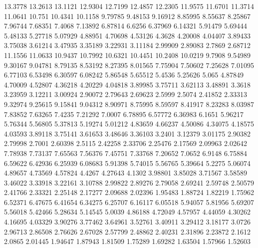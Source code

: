 13.3778      13.2613      13.1121      12.9304      12.7199      12.4857      12.2305      11.9575      11.6701      11.3714      11.0641      10.751      10.4341      10.1158      9.79785      9.48153      9.16912      8.85995      8.55637      8.25867      7.96744      7.68351      7.4068      7.13892      6.87814      6.6256      6.37969      6.14321      5.91479      5.69444      5.48133      5.27718      5.07929      4.88951      4.70698      4.53126      4.3628      4.20008      4.04407      3.89433      3.75038      3.61214      3.47935      3.35189      3.22931      3.11184      2.99909      2.89083      2.7869      2.68712      
11.1556      11.0633      10.9437      10.7992      10.6321      10.4451      10.2408      10.0219      9.7908      9.54989      9.30167      9.04781      8.79135      8.53192      8.27395      8.01565      7.75904      7.50602      7.25628      7.01095      6.77103      6.53498      6.30597      6.08242      5.86548      5.65512      5.4536      5.25626      5.065      4.87849      4.70009      4.52807      4.36218      4.20229      4.04818      3.89985      3.75711      3.62113      3.48891      3.3618      3.23959      3.12211      3.00924      2.90072      2.79643      2.69623      2.5999      2.5074      2.41852      2.33313      
9.32974      9.25615      9.15841      9.04312      8.90971      8.75995      8.59597      8.41917      8.23283      8.03987      7.83852      7.63265      7.4235      7.21292      7.0007      6.78895      6.57772      6.36983      6.1651      5.96217      5.76344      5.56805      5.37813      5.19274      5.01212      4.83659      4.66237      4.50086      4.34075      4.18575      4.03593      3.89118      3.75141      3.61653      3.48646      3.36103      3.2401      3.12379      3.01175      2.90382      2.79998      2.7001      2.60398      2.5115      2.42258      2.33706      2.25476      2.17569      2.09963      2.02642      
7.78938      7.73137      7.65563      7.56376      7.45751      7.33768      7.20652      7.0652      6.9148      6.75884      6.59622      6.42936      6.25939      6.08683      5.91398      5.74015      5.56765      5.39664      5.2275      5.06074      4.89657      4.73569      4.57824      4.4267      4.27643      4.1302      3.98801      3.85028      3.71567      3.58589      3.46022      3.33918      3.22161      3.10788      2.99822      2.89276      2.79058      2.69241      2.59748      2.50579      2.41766      2.33321      2.25148      2.17277      2.09688      2.02396      1.95483      1.88724      1.82219      1.75962      
6.52371      6.47675      6.41654      6.34275      6.25707      6.16117      6.05518      5.94057      5.81956      5.69207      5.56018      5.42466      5.28634      5.14545      5.0039      4.86188      4.72049      4.57957      4.44059      4.30262      4.16695      4.03329      3.90276      3.77462      3.64961      3.52761      3.40911      3.29412      3.18177      3.0726      2.96713      2.86508      2.76626      2.67028      2.57799      2.48862      2.40231      2.31896      2.23872      2.1612      2.0865      2.01445      1.94647      1.87943      1.81509      1.75289      1.69282      1.63504      1.57966      1.52603      
